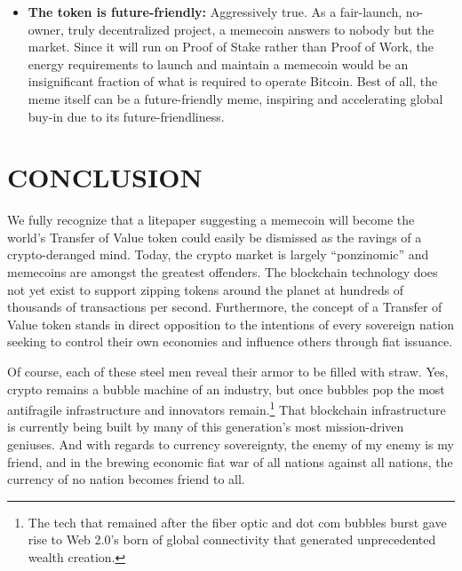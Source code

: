 \documentclass{article}
\begin{document}
\begin{itemize}
\begin{itemize}
\item DAO members from around the world onboard their communities to the DAO, slowly at first, then in droves
\item DAO members do not horde \$MEME because it's more valuable to spend to grow the community than it is to sit on like a ``Store of Value''
\item Various DAOs and blockchain-powered platforms begin to adopt \$MEME as a currency due to its growing adoption and devoted community, interlinking disparate groups around the shared values of \$MEME's ``conceptual identity DNA.''
\item As blockchain becomes the primary value transmission mechanism for the globe \$MEME becomes the primary TOV for blockchain.\footnote{Of course \$MEME serves in the above example is a stand-in for any memecoin currently in existence or yet to be minted}
\end{itemize}
\item \textbf{The token is future-friendly:} Aggressively true. As a fair-launch, no-owner, truly decentralized project, a memecoin answers to nobody but the market. Since it will run on Proof of Stake rather than Proof of Work, the energy requirements to launch and maintain a memecoin would be an insignificant fraction of what is required to operate Bitcoin. Best of all, the meme itself can be a future-friendly meme, inspiring and accelerating global buy-in due to its future-friendliness.
\end{itemize}

\section*{CONCLUSION}

We fully recognize that a litepaper suggesting a memecoin will become the world's Transfer of Value token could easily be dismissed as the ravings of a crypto-deranged mind. Today, the crypto market is largely ``ponzinomic'' and memecoins are amongst the greatest offenders. The blockchain technology does not yet exist to support zipping tokens around the planet at hundreds of thousands of transactions per second. Furthermore, the concept of a Transfer of Value token stands in direct opposition to the intentions of every sovereign nation seeking to control their own economies and influence others through fiat issuance.

Of course, each of these steel men reveal their armor to be filled with straw. Yes, crypto remains a bubble machine of an industry, but once bubbles pop the most antifragile infrastructure and innovators remain.\footnote{The tech that remained after the fiber optic and dot com bubbles burst gave rise to Web 2.0's born of global connectivity that generated unprecedented wealth creation.} That blockchain infrastructure is currently being built by many of this generation's most mission-driven geniuses. And with regards to currency sovereignty, the enemy of my enemy is my friend, and in the brewing economic fiat war of all nations against all nations, the currency of no nation becomes friend to all.
\end{document}
